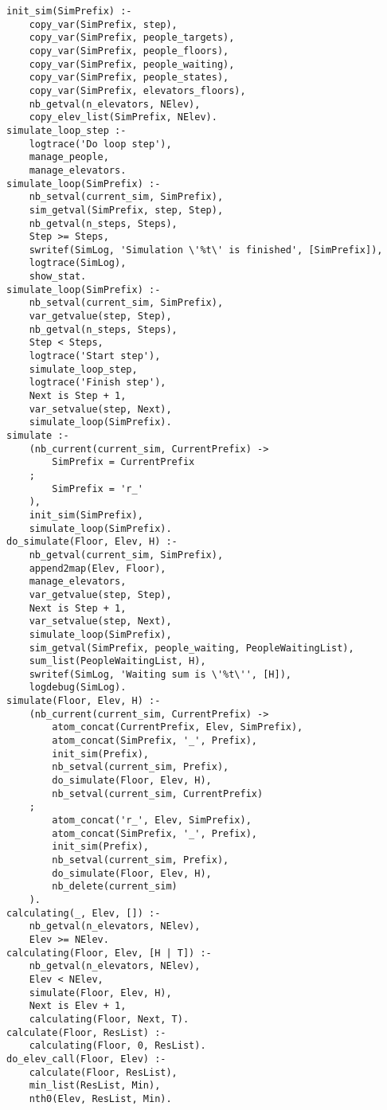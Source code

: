 
\begin{lstlisting}
init_sim(SimPrefix) :-
	copy_var(SimPrefix, step),
	copy_var(SimPrefix, people_targets),
	copy_var(SimPrefix, people_floors),
	copy_var(SimPrefix, people_waiting),
	copy_var(SimPrefix, people_states),
	copy_var(SimPrefix, elevators_floors),
	nb_getval(n_elevators, NElev),
	copy_elev_list(SimPrefix, NElev).
simulate_loop_step :-
	logtrace('Do loop step'),
	manage_people,
	manage_elevators.
simulate_loop(SimPrefix) :-
	nb_setval(current_sim, SimPrefix),
	sim_getval(SimPrefix, step, Step),
	nb_getval(n_steps, Steps),
	Step >= Steps,
	swritef(SimLog, 'Simulation \'%t\' is finished', [SimPrefix]),
	logtrace(SimLog),
	show_stat.
simulate_loop(SimPrefix) :-
	nb_setval(current_sim, SimPrefix),
	var_getvalue(step, Step),
	nb_getval(n_steps, Steps),
	Step < Steps,
	logtrace('Start step'),
	simulate_loop_step,
	logtrace('Finish step'),
	Next is Step + 1,
	var_setvalue(step, Next),
	simulate_loop(SimPrefix).
simulate :-
	(nb_current(current_sim, CurrentPrefix) ->
		SimPrefix = CurrentPrefix
	;
		SimPrefix = 'r_'
	),
	init_sim(SimPrefix),
	simulate_loop(SimPrefix).
do_simulate(Floor, Elev, H) :-
	nb_getval(current_sim, SimPrefix),
	append2map(Elev, Floor),
	manage_elevators,
	var_getvalue(step, Step),
	Next is Step + 1,
	var_setvalue(step, Next),
	simulate_loop(SimPrefix),
	sim_getval(SimPrefix, people_waiting, PeopleWaitingList),
	sum_list(PeopleWaitingList, H),
	swritef(SimLog, 'Waiting sum is \'%t\'', [H]),
	logdebug(SimLog).
simulate(Floor, Elev, H) :-
	(nb_current(current_sim, CurrentPrefix) ->
		atom_concat(CurrentPrefix, Elev, SimPrefix),
		atom_concat(SimPrefix, '_', Prefix),
		init_sim(Prefix),
		nb_setval(current_sim, Prefix),
		do_simulate(Floor, Elev, H),
		nb_setval(current_sim, CurrentPrefix)
	;
		atom_concat('r_', Elev, SimPrefix),
		atom_concat(SimPrefix, '_', Prefix),
		init_sim(Prefix),
		nb_setval(current_sim, Prefix),
		do_simulate(Floor, Elev, H),
		nb_delete(current_sim)
	).
calculating(_, Elev, []) :-
	nb_getval(n_elevators, NElev),
   	Elev >= NElev.
calculating(Floor, Elev, [H | T]) :-
	nb_getval(n_elevators, NElev),
   	Elev < NElev,
	simulate(Floor, Elev, H),
	Next is Elev + 1,
	calculating(Floor, Next, T).
calculate(Floor, ResList) :-
	calculating(Floor, 0, ResList).
do_elev_call(Floor, Elev) :-
	calculate(Floor, ResList),
	min_list(ResList, Min),
	nth0(Elev, ResList, Min).
\end{lstlisting}
